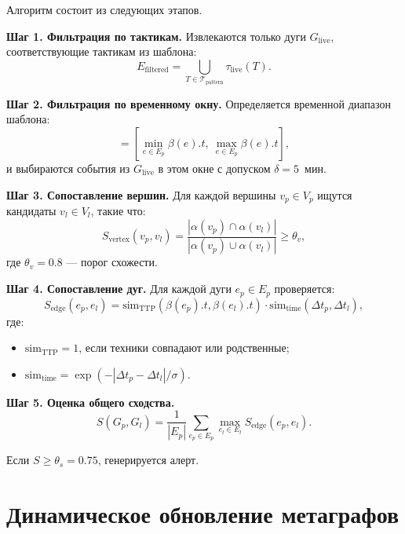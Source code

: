 Алгоритм состоит из следующих этапов.

\textbf{Шаг 1. Фильтрация по тактикам.}  
Извлекаются только дуги $G_{\text{live}}$, соответствующие тактикам из шаблона:
\begin{equation}
E_{\text{filtered}} = \bigcup_{T \in \mathcal{T}_{\text{pattern}}} \tau_{\text{live}}(T).
\label{eq:filter_tactics}
\end{equation}

\textbf{Шаг 2. Фильтрация по временному окну.}  
Определяется временной диапазон шаблона:
\begin{equation}
[t_{\min}, t_{\max}] = \left[ \min_{e \in E_p} \beta(e).t,\ \max_{e \in E_p} \beta(e).t \right],
\label{eq:time_window}
\end{equation}
и выбираются события из $G_{\text{live}}$ в этом окне с допуском $\delta = 5$~мин.

\textbf{Шаг 3. Сопоставление вершин.}  
Для каждой вершины $v_p \in V_p$ ищутся кандидаты $v_l \in V_l$, такие что:
\begin{equation}
S_{\text{vertex}}(v_p, v_l) = \frac{|\alpha(v_p) \cap \alpha(v_l)|}{|\alpha(v_p) \cup \alpha(v_l)|} \geq \theta_v,
\label{eq:vertex_sim}
\end{equation}
где $\theta_v = 0.8$ — порог схожести.

\textbf{Шаг 4. Сопоставление дуг.}  
Для каждой дуги $e_p \in E_p$ проверяется:
\begin{equation}
S_{\text{edge}}(e_p, e_l) = \text{sim}_{\text{TTP}}(\beta(e_p).t, \beta(e_l).t) \cdot \text{sim}_{\text{time}}(\Delta t_p, \Delta t_l),
\label{eq:edge_sim}
\end{equation}
где:
\begin{itemize} 
    \item $\text{sim}_{\text{TTP}} = 1$, если техники совпадают или родственные;
    \item $\text{sim}_{\text{time}} = \exp(-|\Delta t_p - \Delta t_l| / \sigma)$.
\end{itemize}   
\textbf{Шаг 5. Оценка общего сходства.}
\begin{equation}
S(G_p, G_l) = \frac{1}{|E_p|} \sum_{e_p \in E_p} \max_{e_l \in E_l} S_{\text{edge}}(e_p, e_l).
\label{eq:total_sim}
\end{equation}

Если $S \geq \theta_s = 0.75$, генерируется алерт.

\section{Динамическое обновление метаграфов}


